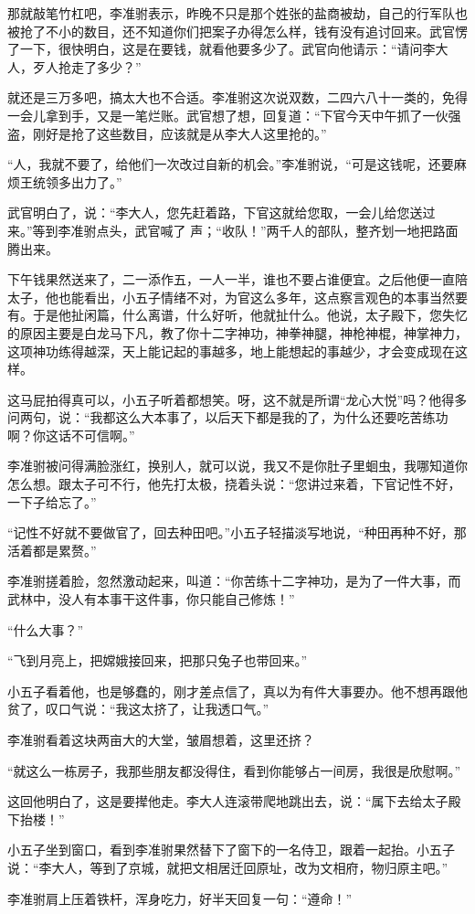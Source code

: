 那就敲笔竹杠吧，李准驸表示，昨晚不只是那个姓张的盐商被劫，自己的行军队也被抢了不小的数目，还不知道你们把案子办得怎么样，钱有没有追讨回来。武官愣了一下，很快明白，这是在要钱，就看他要多少了。武官向他请示：“请问李大人，歹人抢走了多少？”

就还是三万多吧，搞太大也不合适。李准驸这次说双数，二四六八十一类的，免得一会儿拿到手，又是一笔烂账。武官想了想，回复道：“下官今天中午抓了一伙强盗，刚好是抢了这些数目，应该就是从李大人这里抢的。”

“人，我就不要了，给他们一次改过自新的机会。”李准驸说，“可是这钱呢，还要麻烦王统领多出力了。”

武官明白了，说：“李大人，您先赶着路，下官这就给您取，一会儿给您送过来。”等到李准驸点头，武官喊了
声；“收队！”两千人的部队，整齐划一地把路面腾出来。

下午钱果然送来了，二一添作五，一人一半，谁也不要占谁便宜。之后他便一直陪太子，他也能看出，小五子情绪不对，为官这么多年，这点察言观色的本事当然要有。于是他扯闲篇，什么离谱，什么好听，他就扯什么。他说，太子殿下，您失忆的原因主要是白龙马下凡，教了你十二字神功，神拳神腿，神枪神棍，神掌神力，这项神功练得越深，天上能记起的事越多，地上能想起的事越少，才会变成现在这样。

这马屁拍得真可以，小五子听着都想笑。呀，这不就是所谓“龙心大悦”吗？他得多问两句，说：“我都这么大本事了，以后天下都是我的了，为什么还要吃苦练功啊？你这话不可信啊。”

李准驸被问得满脸涨红，换别人，就可以说，我又不是你肚子里蛔虫，我哪知道你怎么想。跟太子可不行，他先打太极，挠着头说：“您讲过来着，下官记性不好，一下子给忘了。”

“记性不好就不要做官了，回去种田吧。”小五子轻描淡写地说，“种田再种不好，那活着都是累赘。”

李准驸搓着脸，忽然激动起来，叫道：“你苦练十二字神功，是为了一件大事，而武林中，没人有本事干这件事，你只能自己修炼！”

“什么大事？”

“飞到月亮上，把嫦娥接回来，把那只兔子也带回来。”

小五子看着他，也是够蠢的，刚才差点信了，真以为有件大事要办。他不想再跟他贫了，叹口气说：“我这太挤了，让我透口气。”

李准驸看着这块两亩大的大堂，皱眉想着，这里还挤？

“就这么一栋房子，我那些朋友都没得住，看到你能够占一间房，我很是欣慰啊。”

这回他明白了，这是要撵他走。李大人连滚带爬地跳出去，说：“属下去给太子殿下抬楼！”

小五子坐到窗口，看到李准驸果然替下了窗下的一名侍卫，跟着一起抬。小五子说：“李大人，等到了京城，就把文相居迁回原址，改为文相府，物归原主吧。”

李准驸肩上压着铁杆，浑身吃力，好半天回复一句：“遵命！”

\newpage